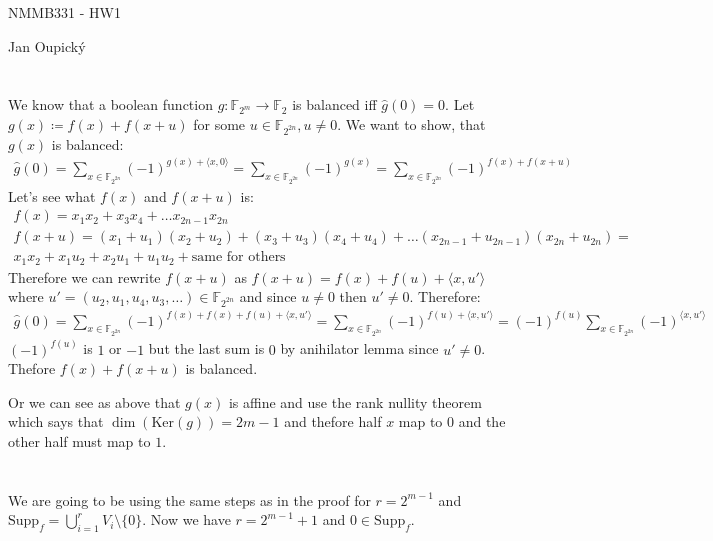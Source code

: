 \documentclass[12pt, a4paper]{article}
\begin{document}
\begin{center}
\large NMMB331 - HW1

\normalsize Jan Oupický
\end{center}
\vspace{1\baselineskip}

\section{}
We know that a boolean function $g: \mathbb{F}_{2^m} \rightarrow \mathbb{F}_2$ is balanced iff $\hat{g}(0) = 0$. Let $g(x) \coloneqq f(x)+f(x+u)$ for some $u \in \mathbb{F}_{2^{2n}}, u \neq 0$. We want to show, that $g(x)$ is balanced:
\begin{gather*}
\hat{g}(0) = \sum\limits_{x \in \mathbb{F}_{2^{2n}}} (-1)^{g(x)+\langle x,0 \rangle} = \sum\limits_{x \in \mathbb{F}_{2^{2n}}} (-1)^{g(x)} = \sum\limits_{x \in \mathbb{F}_{2^{2n}}} (-1)^{f(x)+f(x+u)}
\end{gather*}
Let's see what $f(x)$ and $f(x+u)$ is:
\begin{gather*}
f(x) = x_1 x_2 + x_3 x_4 + \dots x_{2n-1} x_{2n}\\
f(x+u) = (x_1+u_1) (x_2+u_2) + (x_3+u_3) (x_4+u_4) + \dots (x_{2n-1}+u_{2n-1}) (x_{2n}+u_{2n}) =\\
x_1 x_2 + x_1 u_2 + x_2 u_1 + u_1 u_2 + \text{same for others}
\end{gather*}
Therefore we can rewrite $f(x+u)$ as $f(x+u)=f(x)+f(u)+\langle x,u' \rangle$ where $u' = (u_2,u_1,u_4,u_3,\dots) \in \mathbb{F}_{2^{2n}}$ and since $u \neq 0$ then $u' \neq 0$. Therefore:
\begin{gather*}
\hat{g}(0) = \sum\limits_{x \in \mathbb{F}_{2^{2n}}} (-1)^{f(x)+f(x)+f(u)+\langle x,u' \rangle} = \sum\limits_{x \in \mathbb{F}_{2^{2n}}} (-1)^{f(u)+\langle x,u' \rangle} = (-1)^{f(u)}\sum\limits_{x \in \mathbb{F}_{2^{2n}}} (-1)^{\langle x,u' \rangle}
\end{gather*}
$(-1)^{f(u)}$ is $1$ or $-1$ but the last sum is $0$ by anihilator lemma since $u' \neq 0$. Thefore $f(x)+f(x+u)$ is balanced.

Or we can see as above that $g(x)$ is affine and use the rank nullity theorem which says that $\dim(\text{Ker}(g)) = 2m-1$ and thefore half $x$ map to $0$ and the other half must map to $1$.
\section{}
We are going to be using the same steps as in the proof for $r = 2^{m-1}$ and \\$\text{Supp}_f = \bigcup\limits_{i=1}^{r} V_i \setminus \{0\}$. Now we have $r = 2^{m-1}+1$ and $0 \in \text{Supp}_f$. 
\end{document}
